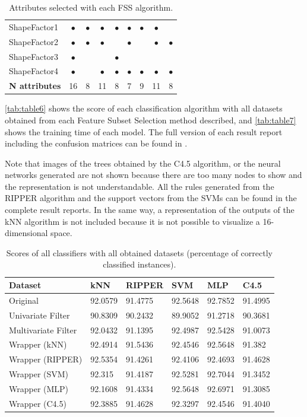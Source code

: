 \documentclass[a4paper,11pt]{article}
\begin{document}
\begin{table}[h]
\begin{tabular}{||l|c|c|c|c|c|c|c|c||}
    ShapeFactor1 & $\bullet$ & $\bullet$ & $\bullet$ & $\bullet$ & $\bullet$ & $\bullet$ & $\bullet$ &\\
    ShapeFactor2 & $\bullet$ & $\bullet$ & $\bullet$ & & $\bullet$ & & $\bullet$ & $\bullet$\\
    ShapeFactor3 & $\bullet$ & & & $\bullet$ & & & &\\
	ShapeFactor4 & $\bullet$ & & $\bullet$ & $\bullet$ & $\bullet$ & $\bullet$ & $\bullet$ & $\bullet$\\
    \hline
    \textbf{N attributes} & 16 & 8 & 11 & 8 & 7 & 9 & 11 & 8\\
    \hline
\end{tabular}
\caption{Attributes selected with each FSS algorithm.}
\label{tab:table5}
\end{table}

\autoref{tab:table6} shows the score of each classification algorithm with all datasets obtained from each Feature Subset Selection method described, and \autoref{tab:table7} shows the training time of each model. The full version of each result report including the confusion matrices can be found in \cite{repo}.

Note that images of the trees obtained by the C4.5 algorithm, or the neural networks generated are not shown because there are too many nodes to show and the representation is not understandable. All the rules generated from the RIPPER algorithm and the support vectors from the SVMs can be found in the complete result reports. In the same way, a representation of the outputs of the kNN algorithm is not included because it is not possible to visualize a 16-dimensional space.

\begin{table}[h]
\centering
\begin{tabular}{||l|l|l|l|l|l||}
	\hline
	Dataset & kNN & RIPPER & SVM & MLP & C4.5\\
	\hline
	Original & 92.0579 & 91.4775 & 92.5648 & 92.7852 & 91.4995\\
	Univariate Filter & 90.8309 & 90.2432 & 89.9052 & 91.2718 & 90.3681\\
	Multivariate Filter & 92.0432 & 91.1395 & 92.4987 & 92.5428 & 91.0073\\
	Wrapper (kNN) & 92.4914 & 91.5436 & 92.4546 & 92.5648 & 91.382\\
	Wrapper (RIPPER) & 92.5354 & 91.4261 & 92.4106 & 92.4693 & 91.4628\\
	Wrapper (SVM) & 92.315 & 91.4187 & 92.5281 & 92.7044 & 91.3452\\
	Wrapper (MLP) & 92.1608 & 91.4334 & 92.5648 & 92.6971 & 91.3085\\
	Wrapper (C4.5) & 92.3885 & 91.4628 & 92.3297 & 92.4546 & 91.4040\\
    \hline 
\end{tabular}
\caption{Scores of all classifiers with all obtained datasets (percentage of correctly classified instances).}
\label{tab:table6}
\end{table}
\end{document}
